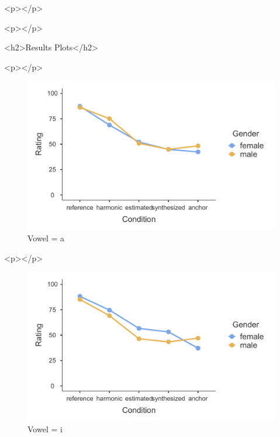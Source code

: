 \documentclass[a4paper,man,hidelinks,floatsintext]{apa7}
\begin{document}
        <p></p>
      
    
      
      
    
      
        <p></p>
      
    <h2>Results Plots</h2>
      
        <p></p>
      
    \begin{figure}[htbp]\caption{Vowel = a}
\label{fig:Figure_1}
\centering
\includegraphics[width=\columnwidth]{figure_1.pdf}
\end{figure}
      
        <p></p>
      
    \begin{figure}[htbp]\caption{Vowel = i}
\label{fig:Figure_2}
\centering
\includegraphics[width=\columnwidth]{figure_2.pdf}
\end{figure}
      
\end{document}
